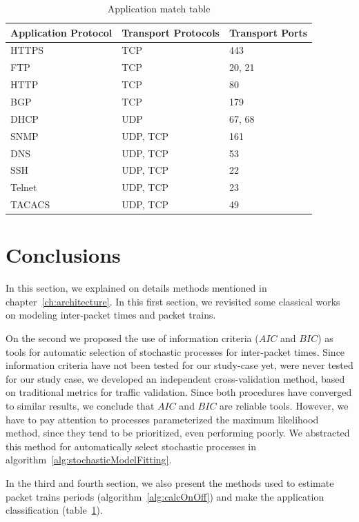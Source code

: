 \begin{table}[ht!]
    \centering
    \caption{Application match table}
    \label{tab:application-protocols}
    \begin{tabular}{lll}
        \hline
        Application Protocol & Transport Protocols & Transport Ports \\ \hline
        \acrshort{HTTPS}               & TCP                & 443             \\
        FTP                 & TCP                & 20, 21          \\
        HTTP                & TCP                & 80              \\
        \acrshort{BGP}                 & TCP                & 179             \\
        \acrshort{DHCP}                & UDP                & 67, 68          \\
        \acrshort{SNMP}                & UDP, TCP           & 161             \\
        \acrshort{DNS}                 & UDP, TCP           & 53              \\
        \acrshort{SSH}                 & UDP, TCP           & 22              \\
        Telnet              & UDP, TCP           & 23              \\
        \acrshort{TACACS}              & UDP, TCP           & 49              \\ \hline
    \end{tabular}
\end{table}


\section{Conclusions}


In this section, we explained on details methods mentioned in chapter~\ref{ch:architecture}. 
In this first section,  we revisited some classical works on modeling inter-packet times and packet trains. 

On the second we proposed the use of information criteria ($AIC$ and $BIC$) as tools for automatic selection of stochastic processes for inter-packet times. Since information criteria have not been tested for our study-case yet, were never tested for our study case, we developed an independent cross-validation method, based on traditional metrics for traffic validation. Since both procedures have converged to similar results, we conclude that $AIC$ and $BIC$ are reliable tools. However, we have to pay attention to processes parameterized the maximum likelihood method, since they tend to be prioritized, even performing poorly.  We abstracted this method for automatically select stochastic processes in algorithm~\ref{alg:stochasticModelFitting}. 

In the third and fourth section, we also present the methods used to estimate packet trains periods (algorithm~\ref{alg:calcOnOff}) and make the application classification (table~\ref{tab:application-protocols}). 
